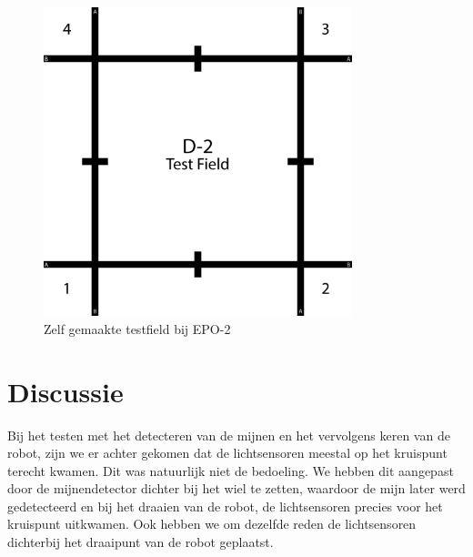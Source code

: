 \documentclass{report}
\begin{document}
\begin{figure}[H]
	\centering
	\includegraphics[width=0.8\textwidth]{d-2_test_field.png}
	\caption{Zelf gemaakte testfield  bij EPO-2}
	\label{fig:testfield}
\end{figure}

\section{Discussie}
Bij het testen met het detecteren van de mijnen en het vervolgens keren van de robot, zijn we er achter gekomen dat de lichtsensoren meestal op het kruispunt terecht kwamen.
Dit was natuurlijk niet de bedoeling.
We hebben dit aangepast door de mijnendetector dichter bij het wiel te zetten, waardoor de mijn later werd gedetecteerd en bij het draaien van de robot, de lichtsensoren precies voor het kruispunt uitkwamen.
Ook hebben we om dezelfde reden de lichtsensoren dichterbij het draaipunt van de robot geplaatst.
\end{document}

